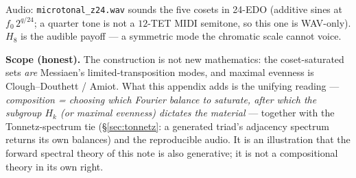 \documentclass[11pt]{article}
\newcommand{\lean}[1]{\texttt{#1}}
\begin{document}
\noindent Audio: \lean{microtonal\_z24.wav} sounds the five cosets in 24-EDO (additive sines at
$f_0\,2^{q/24}$; a quarter tone is not a $12$-TET MIDI semitone, so this one is WAV-only). $H_8$ is the
audible payoff --- a symmetric mode the chromatic scale cannot voice.

\textbf{Scope (honest).} The construction is not new mathematics: the coset-saturated sets \emph{are}
Messiaen's limited-transposition modes, and maximal evenness is Clough--Douthett / Amiot. What this appendix
adds is the unifying reading --- \emph{composition = choosing which Fourier balance to saturate, after which
the subgroup $H_k$ (or maximal evenness) dictates the material} --- together with the Tonnetz-spectrum tie
(\S\ref{sec:tonnetz}: a generated triad's adjacency spectrum returns its own balances) and the reproducible
audio. It is an illustration that the forward spectral theory of this note is also generative; it is not a
compositional theory in its own right.
\end{document}
